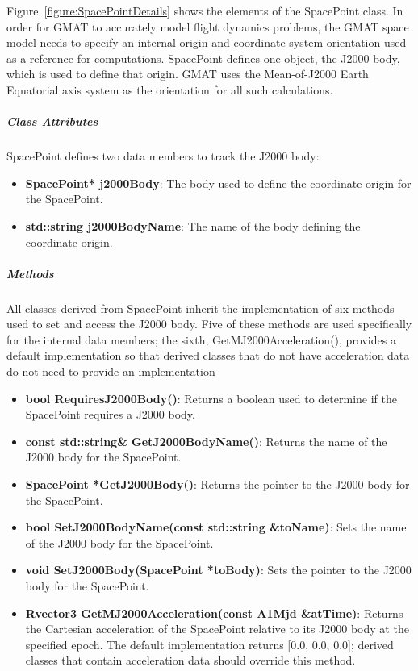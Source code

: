 Figure~\ref{figure:SpacePointDetails} shows the elements of the SpacePoint class.  In
order for GMAT to accurately model flight dynamics problems, the GMAT space model needs to specify
an internal origin and coordinate system orientation used as a reference for computations.
SpacePoint defines one object, the J2000 body, which is used to define that origin.  GMAT uses the
Mean-of-J2000 Earth Equatorial axis system as the orientation for all such calculations.

\subparagraph{\textit{Class Attributes}}

SpacePoint defines two data members to track the J2000 body:

\begin{itemize}
\item \textbf{SpacePoint* j2000Body}: The body used to define the coordinate origin for the
SpacePoint.
\item \textbf{std::string j2000BodyName}: The name of the body defining the coordinate origin.
\end{itemize}

\subparagraph{\textit{Methods}}

All classes derived from SpacePoint inherit the implementation of six methods used to set and access
the J2000 body.  Five of these methods are used specifically for the internal data members; the
sixth, GetMJ2000Acceleration(), provides a default implementation so that derived classes that do
not have acceleration data do not need to provide an implementation

\begin{itemize}
\item \textbf{bool RequiresJ2000Body()}: Returns a boolean used to determine if the SpacePoint
requires a J2000 body.
\item \textbf{const std::string\& GetJ2000BodyName()}: Returns the name of the J2000 body for the
SpacePoint.
\item \textbf{SpacePoint *GetJ2000Body()}: Returns the pointer to the J2000 body for the
SpacePoint.
\item \textbf{bool SetJ2000BodyName(const std::string \&toName)}: Sets the name of the J2000 body
for the SpacePoint.
\item \textbf{void SetJ2000Body(SpacePoint *toBody)}: Sets the pointer to the J2000 body for the
SpacePoint.
\item \textbf{Rvector3 GetMJ2000Acceleration(const A1Mjd \&atTime)}: Returns the Cartesian
acceleration of the SpacePoint relative to its J2000 body at the specified epoch.  The default
implementation returns [0.0, 0.0, 0.0]; derived classes that contain acceleration data should
override this method.
\end{itemize}

